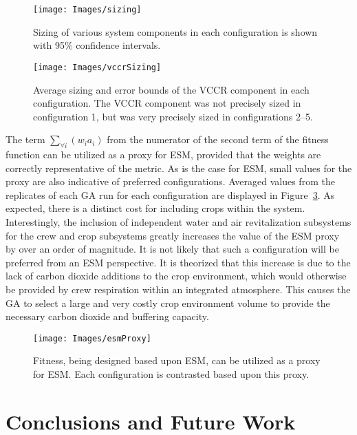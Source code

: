 \documentclass[submit]{aiaa}
\begin{document}
\begin{figure}[htb]
\texttt{[image: Images/sizing]}
\caption{Sizing of various system components in each configuration is
  shown with 95\% confidence intervals.}
\label{fig:compsize}
\end{figure}

\begin{figure}[htb]
\texttt{[image: Images/vccrSizing]}
\caption{Average sizing and error bounds of the VCCR component in each
  configuration. The VCCR component was not precisely sized in
  configuration 1, but was very precisely sized in configurations 2--5.}
\label{fig:vccrsize}
\end{figure}

The term $\sum_{\forall i} (w_ia_i)$ from the numerator of the second
term of the fitness function can be utilized as a proxy for ESM,
provided that the weights are correctly representative of the metric.
As is the case for ESM, small values for the proxy are also indicative
of preferred configurations.  Averaged values from the replicates of
each GA run for each configuration are displayed in
Figure~\ref{fig:esm}. 
As expected, there is a distinct cost for including crops within the system. 
Interestingly, the inclusion of independent  water and air revitalization subsystems for the crew and crop subsystems greatly increases the value of the ESM proxy by over an order of magnitude. 
It is not likely that such a configuration will be preferred from an ESM perspective. 
It is theorized that this increase is due to the lack of carbon dioxide additions to the crop environment,
which would otherwise be provided by crew respiration within an
integrated atmosphere. 
This causes the GA to select a large and very costly crop environment volume to provide the necessary carbon dioxide and buffering capacity.

\begin{figure}[htb]
\texttt{[image: Images/esmProxy]}
\caption{Fitness, being designed based upon ESM, can be utilized as a
  proxy for ESM. Each configuration is contrasted based upon this proxy.}
\label{fig:esm}
\end{figure}

\section{Conclusions and Future Work}
\end{document}
